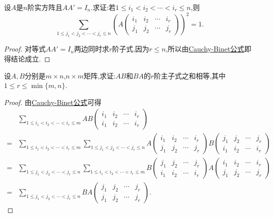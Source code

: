 \documentclass[../../main.tex]{subfiles}
\begin{document}
\begin{example}
设\(A\)是\(n\)阶实方阵且\(AA' = I_n\).求证:若\(1\leqslant  i_1 < i_2 < \cdots < i_r\leqslant  n\),则
\[
\sum_{1\leqslant  j_1<j_2<\cdots<j_r\leqslant  n}\left(A\begin{pmatrix}
i_1 & i_2 & \cdots & i_r\\
j_1 & j_2 & \cdots & j_r
\end{pmatrix}\right)^2 = 1.
\]
\end{example}
\begin{proof}
对等式$AA' = I_n$两边同时求$r$阶子式,因为$r\leqslant  n$,所以由\hyperref[theorem:Cauchy-Binet公式]{Cauchy-Binet公式}即得结论成立.
\end{proof}

\begin{example}
设\(A,B\)分别是\(m\times n\),\(n\times m\)矩阵,求证:\(AB\)和\(BA\)的\(r\)阶主子式之和相等,其中\(1\leqslant  r\leqslant \min\{m,n\}\).
\end{example}
\begin{proof}
由\hyperref[theorem:Cauchy-Binet公式]{Cauchy-Binet公式}可得
\begin{align*}
&\sum_{1\leqslant  i_1 < i_2 < \cdots < i_r\leqslant  m}AB\begin{pmatrix}
i_1 & i_2 & \cdots & i_r\\
i_1 & i_2 & \cdots & i_r
\end{pmatrix}\\
=&\sum_{1\leqslant  i_1 < i_2 < \cdots < i_r\leqslant  m}\sum_{1\leqslant  j_1 < j_2 < \cdots < j_r\leqslant  n}A\begin{pmatrix}
i_1 & i_2 & \cdots & i_r\\
j_1 & j_2 & \cdots & j_r
\end{pmatrix}B\begin{pmatrix}
j_1 & j_2 & \cdots & j_r\\
i_1 & i_2 & \cdots & i_r
\end{pmatrix}\\
=&\sum_{1\leqslant  j_1 < j_2 < \cdots < j_r\leqslant  n}\sum_{1\leqslant  i_1 < i_2 < \cdots < i_r\leqslant  m}B\begin{pmatrix}
j_1 & j_2 & \cdots & j_r\\
i_1 & i_2 & \cdots & i_r
\end{pmatrix}A\begin{pmatrix}
i_1 & i_2 & \cdots & i_r\\
j_1 & j_2 & \cdots & j_r
\end{pmatrix}\\
=&\sum_{1\leqslant  j_1 < j_2 < \cdots < j_r\leqslant  n}BA\begin{pmatrix}
j_1 & j_2 & \cdots & j_r\\
j_1 & j_2 & \cdots & j_r
\end{pmatrix}.
\end{align*}
\end{proof}
\end{document}
